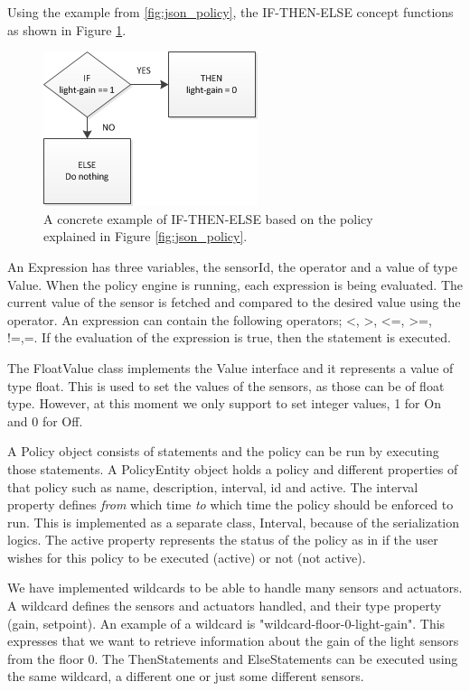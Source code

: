 Using the example from \ref{fig:json_policy}, the IF-THEN-ELSE concept functions as shown in Figure \ref{fig:if-then-else_example}.
\begin{figure}
	\centering
    \includegraphics[scale=0.55]{images/IF-THEN-ELSE_example.png} 
	\caption{A concrete example of IF-THEN-ELSE based on the policy explained in Figure \ref{fig:json_policy}.}
	\label{fig:if-then-else_example}
\end{figure}

An Expression has three variables, the sensorId, the operator and a value of type Value. When the policy engine is running, each expression is being evaluated. The current value of the sensor is fetched and compared to the desired value using the operator. An expression can contain the following operators; <, >, <=, >=, !=,=. 
If the evaluation of the expression is true, then the statement is executed.

The FloatValue class implements the Value interface and it represents a value of type float. This is used to set the values of the sensors, as those can be of float type. However, at this moment we only support to set integer values, 1 for On and 0 for Off.

A Policy object consists of statements and the policy can be run by executing those statements. A PolicyEntity object holds a policy and different properties of that policy such as name, description, interval, id and active. The interval property defines \textit{from} which time \textit{to} which time the policy should be enforced to run. This is implemented as a separate class, Interval, because of the serialization logics. The active property represents the status of the policy as in if the user wishes for this policy to be executed (active) or not (not active).

We have implemented wildcards to be able to handle many sensors and actuators. A wildcard defines the sensors and actuators handled, and their type property (gain, setpoint). An example of a wildcard is "wildcard-floor-0-light-gain". This expresses that we want to retrieve information about the gain of the light sensors from the floor 0. The ThenStatements and ElseStatements can be executed using the same wildcard, a different one or just some different sensors. 

